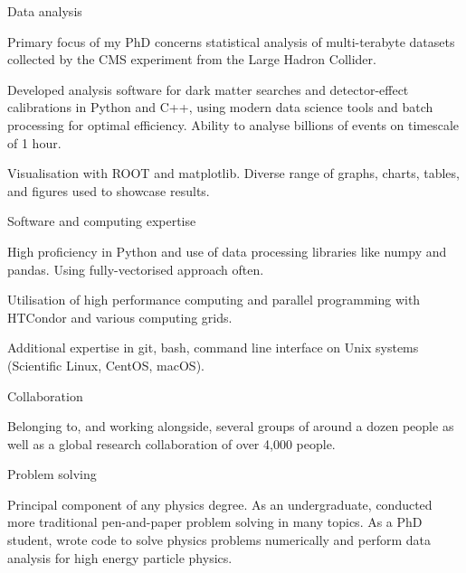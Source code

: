 
\newcommand{\vpaddingskills}{\vspace{1mm}}

\begin{cventries}

    \cventry
    {} %
    {Data analysis} %
    {} %
    {} %
    {
      \begin{cvitems}
        \item {Primary focus of my PhD concerns statistical analysis of multi-terabyte datasets collected by the CMS experiment from the Large Hadron Collider.}
        \item {Developed analysis software for dark matter searches and detector-effect calibrations in Python and C++, using modern data science tools and batch processing for optimal efficiency. Ability to analyse billions of events on timescale of 1 hour.}
        \item{Visualisation with ROOT and matplotlib. Diverse range of graphs, charts, tables, and figures used to showcase results.}
        \vpaddingskills
        \end{cvitems}
    }

    \cventry
    {} %
    {Software and computing expertise} %
    {} %
    {} %
    {
      \begin{cvitems}
        \item {High proficiency in Python and use of data processing libraries like numpy and pandas. Using fully-vectorised approach often.}
        \item {Utilisation of high performance computing and parallel programming with HTCondor and various computing grids.}
        \item{Additional expertise in git, bash, command line interface on Unix systems (Scientific Linux, CentOS, macOS).}
        \vpaddingskills
        \end{cvitems}
    }

    \cventry
    {}
    {Collaboration}
    {}
    {}
    {
      \begin{cvitems}
        \item {Belonging to, and working alongside, several groups of around a dozen people as well as a global research collaboration of over 4,000 people.}
        \vpaddingskills
        \end{cvitems}
    }

    \cventry
    {}
    {Problem solving}
    {}
    {}
    {
      \begin{cvitems}
        \item {Principal component of any physics degree. As an undergraduate, conducted more traditional pen-and-paper problem solving in many topics. As a PhD student, wrote code to solve physics problems numerically and perform data analysis for high energy particle physics.}
        \vpaddingskills
        \end{cvitems}
    }


\end{cventries}
